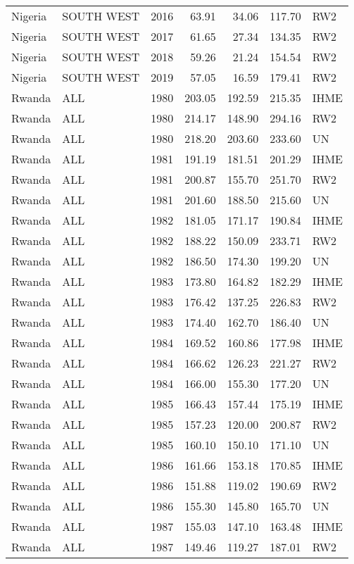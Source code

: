 \begin{longtable}{lllrrrl}
  Nigeria & SOUTH WEST & 2016 & 63.91 & 34.06 & 117.70 & RW2 \\ 
  Nigeria & SOUTH WEST & 2017 & 61.65 & 27.34 & 134.35 & RW2 \\ 
  Nigeria & SOUTH WEST & 2018 & 59.26 & 21.24 & 154.54 & RW2 \\ 
  Nigeria & SOUTH WEST & 2019 & 57.05 & 16.59 & 179.41 & RW2 \\ 
  Rwanda & ALL & 1980 & 203.05 & 192.59 & 215.35 & IHME \\ 
  Rwanda & ALL & 1980 & 214.17 & 148.90 & 294.16 & RW2 \\ 
  Rwanda & ALL & 1980 & 218.20 & 203.60 & 233.60 & UN \\ 
  Rwanda & ALL & 1981 & 191.19 & 181.51 & 201.29 & IHME \\ 
  Rwanda & ALL & 1981 & 200.87 & 155.70 & 251.70 & RW2 \\ 
  Rwanda & ALL & 1981 & 201.60 & 188.50 & 215.60 & UN \\ 
  Rwanda & ALL & 1982 & 181.05 & 171.17 & 190.84 & IHME \\ 
  Rwanda & ALL & 1982 & 188.22 & 150.09 & 233.71 & RW2 \\ 
  Rwanda & ALL & 1982 & 186.50 & 174.30 & 199.20 & UN \\ 
  Rwanda & ALL & 1983 & 173.80 & 164.82 & 182.29 & IHME \\ 
  Rwanda & ALL & 1983 & 176.42 & 137.25 & 226.83 & RW2 \\ 
  Rwanda & ALL & 1983 & 174.40 & 162.70 & 186.40 & UN \\ 
  Rwanda & ALL & 1984 & 169.52 & 160.86 & 177.98 & IHME \\ 
  Rwanda & ALL & 1984 & 166.62 & 126.23 & 221.27 & RW2 \\ 
  Rwanda & ALL & 1984 & 166.00 & 155.30 & 177.20 & UN \\ 
  Rwanda & ALL & 1985 & 166.43 & 157.44 & 175.19 & IHME \\ 
  Rwanda & ALL & 1985 & 157.23 & 120.00 & 200.87 & RW2 \\ 
  Rwanda & ALL & 1985 & 160.10 & 150.10 & 171.10 & UN \\ 
  Rwanda & ALL & 1986 & 161.66 & 153.18 & 170.85 & IHME \\ 
  Rwanda & ALL & 1986 & 151.88 & 119.02 & 190.69 & RW2 \\ 
  Rwanda & ALL & 1986 & 155.30 & 145.80 & 165.70 & UN \\ 
  Rwanda & ALL & 1987 & 155.03 & 147.10 & 163.48 & IHME \\ 
  Rwanda & ALL & 1987 & 149.46 & 119.27 & 187.01 & RW2 \\ 

\end{longtable}
